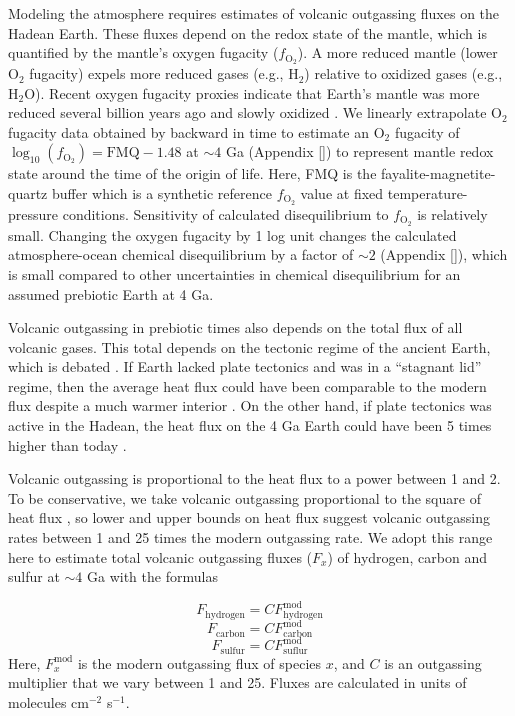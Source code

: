 Modeling the atmosphere requires estimates of volcanic outgassing fluxes on the Hadean Earth. These fluxes depend on the redox state of the mantle, which is quantified by the mantle's oxygen fugacity ($f_\mathrm{O_2}$). A more reduced mantle (lower O$_2$ fugacity) expels more reduced gases (e.g., H$_2$) relative to oxidized gases (e.g., H$_2$O). Recent oxygen fugacity proxies indicate that Earth's mantle was more reduced several billion years ago and slowly oxidized \citep{Aulbach_2016,Nicklas_2019}. We linearly extrapolate O$_2$ fugacity data obtained by \citet{Aulbach_2016} backward in time to estimate an O$_2$ fugacity of $\log_{10}\left(f_\mathrm{O_2}\right) = \mathrm{FMQ} - 1.48$ at $\sim 4$ Ga 
(Appendix \ref{}) %
to represent mantle redox state around the time of the origin of life. Here, FMQ is the fayalite-magnetite-quartz buffer which is a synthetic reference $f_\mathrm{O_2}$ value at fixed temperature-pressure conditions. Sensitivity of calculated disequilibrium to $f_\mathrm{O_2}$ is relatively small. Changing the oxygen fugacity by 1 log unit changes the calculated atmosphere-ocean chemical disequilibrium by a factor of $\sim 2$ 
(Appendix \ref{}), %
which is small compared to other uncertainties in chemical disequilibrium for an assumed prebiotic Earth at 4 Ga.

Volcanic outgassing in prebiotic times also depends on the total flux of all volcanic gases. This total depends on the tectonic regime of the ancient Earth, which is debated \citep{Rosas_2018}. If Earth lacked plate tectonics and was in a ``stagnant lid'' regime, then the average heat flux could have been comparable to the modern flux despite a much warmer interior \citep{Korenaga_2009}. On the other hand, if plate tectonics was active in the Hadean, the heat flux on the 4 Ga Earth could have been 5 times higher than today \citep{Sleep_2001}.

Volcanic outgassing is proportional to the heat flux to a power between 1 and 2. To be conservative, we take volcanic outgassing proportional to the square of heat flux \citep{Sleep_2001}, so lower and upper bounds on heat flux suggest volcanic outgassing rates between 1 and 25 times the modern outgassing rate. We adopt this range here to estimate total volcanic outgassing fluxes ($F_x$) of hydrogen, carbon and sulfur at $\sim 4$ Ga with the formulas

\begin{equation}
  \label{eq:h_volc_flux}
  F_\mathrm{hydrogen} = C F_\mathrm{hydrogen}^\mathrm{mod}
\end{equation}
\begin{equation}
  \label{eq:c_volc_flux}
  F_\mathrm{carbon} = C F_\mathrm{carbon}^\mathrm{mod}
\end{equation}
\begin{equation}
  \label{eq:s_volc_flux}
  F_\mathrm{sulfur} = C F_\mathrm{suflur}^\mathrm{mod}
\end{equation}
Here, $F_x^\mathrm{mod}$ is the modern outgassing flux of species $x$, and $C$ is an outgassing multiplier that we vary between 1 and 25. Fluxes are calculated in units of molecules cm$^{-2}$ s$^{-1}$.

